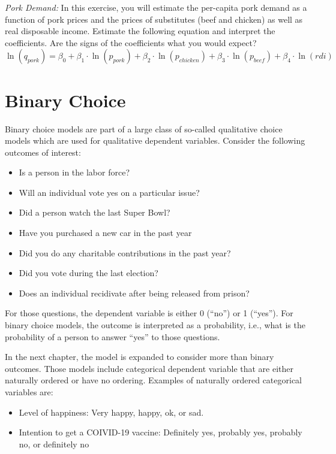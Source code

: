 \documentclass[
]{article}
\providecommand{\tightlist}{%
  \setlength{\itemsep}{0pt}\setlength{\parskip}{0pt}}
\begin{document}
\item

\emph{Pork Demand:} In this exercise, you will estimate the per-capita pork demand as a function of pork prices and the prices of substitutes (beef and chicken) as well as real disposable income. Estimate the following equation and interpret the coefficients. Are the signs of the coefficients what you would expect?
\begin{equation*}
\ln(q_{pork}) = \beta_0 + \beta_1 \cdot \ln(p_{pork}) + \beta_2 \cdot \ln(p_{chicken}) + \beta_3 \cdot \ln(p_{beef}) + \beta_4 \cdot \ln(rdi)
\end{equation*}

\hypertarget{binary-choice}{%
\section{Binary Choice}\label{binary-choice}}

Binary choice models are part of a large class of so-called qualitative choice models which are used for qualitative dependent variables. Consider the following outcomes of interest:

\begin{itemize}
\tightlist
\item
  Is a person in the labor force?
\item
  Will an individual vote yes on a particular issue?
\item
  Did a person watch the last Super Bowl?
\item
  Have you purchased a new car in the past year
\item
  Did you do any charitable contributions in the past year?
\item
  Did you vote during the last election?
\item
  Does an individual recidivate after being released from prison?
\end{itemize}

For those questions, the dependent variable is either 0 (``no'') or 1 (``yes''). For binary choice models, the outcome is interpreted as a probability, i.e., what is the probability of a person to answer ``yes'' to those questions.

In the next chapter, the model is expanded to consider more than binary outcomes. Those models include categorical dependent variable that are either naturally ordered or have no ordering. Examples of naturally ordered categorical variables are:

\begin{itemize}
\tightlist
\item
  Level of happiness: Very happy, happy, ok, or sad.
\item
  Intention to get a COIVID-19 vaccine: Definitely yes, probably yes, probably no, or definitely no
\end{itemize}
\end{document}
